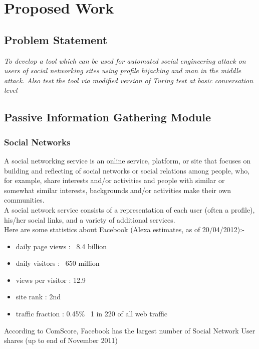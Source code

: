 \chapter{Proposed Work}

\section{Problem Statement}
\emph{To develop a tool which can be used for automated social engineering attack on users of social networking sites using profile hijacking and man in the middle attack. Also test the tool via modified version of Turing test at basic conversation level}

\section{Passive Information Gathering Module}

\subsection{Social Networks}
A social networking service is an online service, platform, or site that focuses on building and reflecting of 
social networks or social relations among people, who, for example, share interests and/or activities and people 
with similar or somewhat similar interests, backgrounds and/or activities make their own communities.\\[0.5cm]
A social network service consists of a representation of each user (often a
profile), his/her social links, and a variety of additional services.\\[0.5cm]
Here are some statistics about Facebook (Alexa estimates, as of 20/04/2012):-
\begin{itemize}
\item{daily page views : ~8.4 billion}
\item{daily visitors : ~650 million}
\item{views per visitor : 12.9}
\item{site rank : 2nd}
\item{traffic fraction : 0.45\% ~1  in  220   of all web traffic }
\end{itemize}
\newpage
According to ComScore, Facebook has the largest number of Social Network User shares (up to end of November 2011)\cite{marketshare}\\

